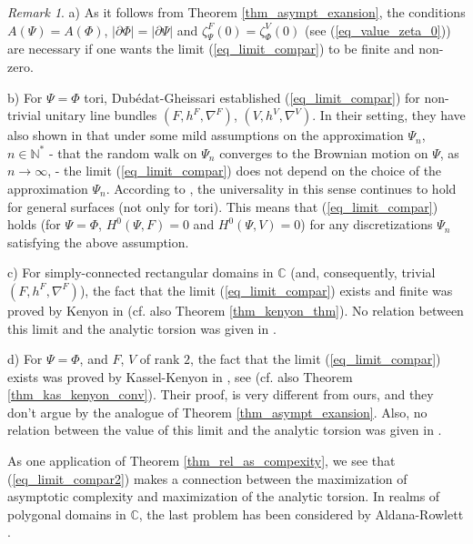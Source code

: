 \documentclass[12pt]{article}
\numberwithin{equation}{section}
\theoremstyle{theorem}
\theoremstyle{definition}
\theoremstyle{remark}
\newtheorem{rem}[thm]{Remark}
\newcommand{\comp}{\mathbb{C}}
\newcommand{\nat}{\mathbb{N}}
\begin{document}
	\begin{rem}\label{rem_as_compl_compar}
		a) As it follows from Theorem \ref{thm_asympt_exansion}, the conditions $A(\Psi) = A(\Phi)$,  $|\partial \Phi| = |\partial \Psi|$ and $\zeta_{\Psi}^{F}(0) = \zeta_{\Phi}^{V}(0)$ (see (\ref{eq_value_zeta_0})) are necessary if one wants the limit (\ref{eq_limit_compar}) to be finite and non-zero.
		\par 
		b) For $\Psi = \Phi$ tori, {Dub\'edat}-{Gheissari} \cite[Proposition 4]{DubGheiss} established (\ref{eq_limit_compar}) for non-trivial unitary line bundles $(F, h^F, \nabla^F)$, $(V, h^V, \nabla^V)$. In their setting, they have also shown in \cite[Proposition 3]{DubGheiss} that under some mild assumptions on the approximation $\Psi_n$, $n \in \nat^*$ - that the random walk on $\Psi_n$ converges to the Brownian motion on $\Psi$, as $n \to \infty$, - the limit (\ref{eq_limit_compar}) does not depend on the choice of the approximation $\Psi_n$.
		According to \cite[end of \S 1]{DubGheiss}, the universality in this sense continues to hold for general surfaces (not only for tori). 
		This means that (\ref{eq_limit_compar}) holds (for $\Psi = \Phi$, $H^0(\Psi, F) = 0$ and $H^0(\Psi, V) = 0$) for any discretizations $\Psi_n$ satisfying the above assumption.
		\par 
		c) For simply-connected rectangular domains in $\comp$ (and, consequently, trivial $(F, h^F, \nabla^F)$), the fact that the limit (\ref{eq_limit_compar}) exists and finite was proved by Kenyon in \cite[Corollary 2 and Remark 4]{KenyonDet} (cf. also Theorem \ref{thm_kenyon_thm}). No relation between this limit and the analytic torsion was given in \cite{KenyonDet}.
		\par 
		d) For $\Psi = \Phi$, and $F$, $V$ of rank $2$, the fact that the limit (\ref{eq_limit_compar}) exists was proved by Kassel-Kenyon in \cite[Theorem 17]{KassKenyon}, see \cite[\S 4.1]{KassKenyon} (cf. also Theorem \ref{thm_kas_kenyon_conv}). 
		Their proof, is very different from ours, and they don't argue by the analogue of Theorem \ref{thm_asympt_exansion}. 
		Also, no relation between the value of this limit and the analytic torsion was given in \cite{KassKenyon}.
	\end{rem}
	As one application of Theorem \ref{thm_rel_as_compexity}, we see that (\ref{eq_limit_compar2}) makes a connection between the maximization of asymptotic complexity and maximization of the analytic torsion.
	In realms of polygonal domains in $\comp$, the last problem has been considered by Aldana-Rowlett \cite[Conjecture 1 and Theorem 5]{AldRowl}.
\end{document}
